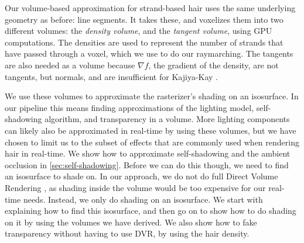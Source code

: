 \documentclass{egpubl}
\begin{document}


Our volume-based approximation for strand-based hair uses the same underlying geometry as before: line segments. It takes these, and voxelizes them into two different volumes: the \emph{density volume}, and the \emph{tangent volume}, using GPU computations. The densities are used to represent the number of strands that have passed through a voxel, which we use to do our raymarching. The tangents are also needed as a volume because $\nabla f$, the gradient of the density, are not tangents, but normals, and are insufficient for Kajiya-Kay \cite{kajiya1989rendering}.

We use these volumes to approximate the rasterizer's shading on an isosurface. In our pipeline this means finding approximations of the lighting model, self-shadowing algorithm, and transparency in a volume. More lighting components can likely also be approximated in real-time by using these volumes, but we have chosen to limit us to the subset of effects that are commonly used when rendering hair in real-time. We show how to approximate self-shadowing and the ambient occlusion in \cref{sec:self-shadowing}. Before we can do this though, we need to find an isosurface to shade on. In our approach, we do not do full Direct Volume Rendering \cite{hadwiger2006gpu}, as shading inside the volume would be too expensive for our real-time needs. Instead, we only do shading on an isosurface. We start with explaining how to find this isosurface, and then go on to show how to do shading on it by using the volumes we have derived. We also show how to fake transparency without having to use DVR, by using the hair density.
\end{document}
